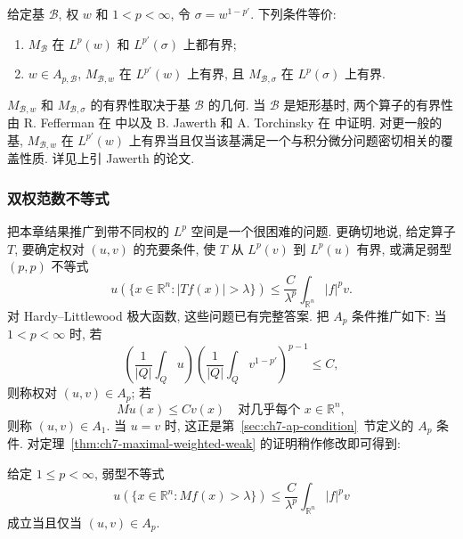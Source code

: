 \begin{Theorem}
\label{thm:ch7-basis-weighted-equivalence}
给定基 $\mathcal B$, 权 $w$ 和 $1<p<\infty$, 令 $\sigma=w^{1-p'}$. 下列条件等价:
\begin{enumerate}[label=(\arabic*)]
\item $M_\mathcal B$ 在 $L^p(w)$ 和 $L^{p'}(\sigma)$ 上都有界;
\item $w\in A_{p,\mathcal B}$, $M_{\mathcal B,w}$ 在 $L^{p'}(w)$ 上有界, 且 $M_{\mathcal B,\sigma}$ 在 $L^p(\sigma)$ 上有界.
\end{enumerate}
\end{Theorem}

\hypertarget{chapter-07-page-166}{}
$M_{\mathcal B,w}$ 和 $M_{\mathcal B,\sigma}$ 的有界性取决于基 $\mathcal B$ 的几何. 当 $\mathcal B$ 是矩形基时, 两个算子的有界性由 R. Fefferman 在  中以及 B. Jawerth 和 A. Torchinsky 在  中证明. 对更一般的基, $M_{\mathcal B,w}$ 在 $L^{p'}(w)$ 上有界当且仅当该基满足一个与积分微分问题密切相关的覆盖性质. 详见上引 Jawerth 的论文.

\subsubsection{双权范数不等式}
\label{subsec:ch7-two-weights}

把本章结果推广到带不同权的 $L^p$ 空间是一个很困难的问题. 更确切地说, 给定算子 $T$, 要确定权对 $(u,v)$ 的充要条件, 使 $T$ 从 $L^p(v)$ 到 $L^p(u)$ 有界, 或满足弱型 $(p,p)$ 不等式
\[
 u(\{x\in\mathbb R^n:|Tf(x)|>\lambda\})
 \le\frac C{\lambda^p}\int_{\mathbb R^n}|f|^pv.
\]
对 Hardy--Littlewood 极大函数, 这些问题已有完整答案. 把 $A_p$ 条件推广如下: 当 $1<p<\infty$ 时, 若
\[
 \left(\frac1{|Q|}\int_Qu\right)
 \left(\frac1{|Q|}\int_Qv^{1-p'}\right)^{p-1}\le C,
\]
则称权对 $(u,v)\in A_p$; 若
\[
 Mu(x)\le Cv(x)\quad\text{对几乎每个 }x\in\mathbb R^n,
\]
则称 $(u,v)\in A_1$. 当 $u=v$ 时, 这正是第~\ref{sec:ch7-ap-condition}~节定义的 $A_p$ 条件. 对定理~\ref{thm:ch7-maximal-weighted-weak} 的证明稍作修改即可得到:

\begin{Theorem}
\label{thm:ch7-two-weight-maximal-weak}
给定 $1\le p<\infty$, 弱型不等式
\[
 u(\{x\in\mathbb R^n:Mf(x)>\lambda\})
 \le\frac C{\lambda^p}\int_{\mathbb R^n}|f|^pv
\]
成立当且仅当 $(u,v)\in A_p$.
\end{Theorem}

